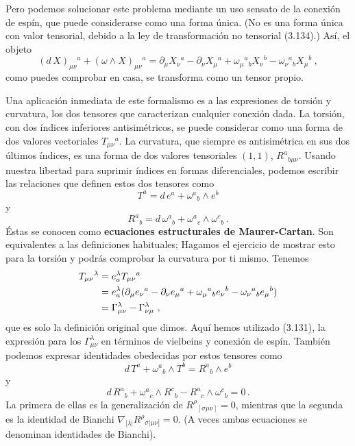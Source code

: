 \documentclass[11pt,b5paper,openany,twoside]{book}
\newcommand{\mn}{{\mu\nu}}
\newcommand{\p}[1]{{\partial_{#1}}}
\begin{document}
Pero podemos solucionar este problema mediante un uso sensato de la conexión de espín, que puede considerarse como una forma única.
(No es una forma única con valor tensorial, debido a la ley de transformación no tensorial (3.134).)
Así, el objeto
\begin{equation}
( d\,X)_{\mn}{}^a +(\omega\wedge X)_{\mn}{}^a
= \p\mu X_\nu{}^a - \p\nu X_\mu{}^a
+\omega_\mu{}^a{}_b X_\nu{}^b - \omega_\nu{}^a{}_b X_\mu{}^b
\ ,\label{3.136}
\end{equation}
como puedes comprobar en casa, se transforma como un tensor propio.

Una aplicación inmediata de este formalismo es a las expresiones de torsión y curvatura, los dos tensores que caracterizan cualquier conexión dada.
La torsión, con dos índices inferiores antisimétricos, se puede considerar como una forma de dos valores vectoriales $T_{\mn}{}^a$.
La curvatura, que siempre es antisimétrica en sus dos últimos índices, es una forma de dos valores tensoriales $(1,1)$, $R^a{}_{b\mn}$.
Usando nuestra libertad para suprimir índices en formas diferenciales, podemos escribir las relaciones que definen estos dos tensores como
\begin{equation}
T^a =  d\,e^a + \omega^a{}_b\wedge e^b\label{3.137}
\end{equation}
y
\begin{equation}
R^a{}_b =  d\, \omega^a{}_b + \omega^a{}_c\wedge\omega^c{}_b\,.
\label{3.138}
\end{equation}
Éstas se conocen como {\bf ecuaciones estructurales de Maurer-Cartan}.
Son equivalentes a las definiciones habituales; Hagamos el ejercicio de mostrar esto para la torsión y podrás comprobar la curvatura por ti mismo.
Tenemos
\begin{align}
T_\mn{}^\lambda  &=  e^\lambda_a T_\mn{}^a \notag \\
&=  e^\lambda_a(\p\mu e_\nu{}^a - \p\nu e_\mu{}^a
+\omega_\mu{}^a{}_b e_\nu{}^b - \omega_\nu{}^a{}_b e_\mu{}^b) \notag \\
&=  \Gamma^\lambda_{\mn} - \Gamma^\lambda_{\nu\mu}\ ,
\label{3.139}
\end{align}
que es solo la definición original que dimos.
Aquí hemos utilizado (3.131), la expresión para los $\Gamma^\lambda_{\mn}$ en términos de vielbeins y conexión de espín.
También podemos expresar identidades obedecidas por estos tensores como
\begin{equation}
 d\,T^a + \omega^a{}_b\wedge T^b = R^a{}_b\wedge e^b\label{3.140}
\end{equation}
y
\begin{equation}
 d\,R^a{}_b + \omega^a{}_c\wedge R^c{}_b - R^a{}_c\wedge
\omega^c{}_b=0\,.\label{3.141}
\end{equation}
La primera de ellas es la generalización de $R^\rho{}_{[\sigma\mn]}=0$, mientras que la segunda es la identidad de Bianchi $\nabla_{[\lambda|} R^\rho{}_{\sigma |\mn]}=0$.
(A veces ambas ecuaciones se denominan identidades de Bianchi).
\end{document}

